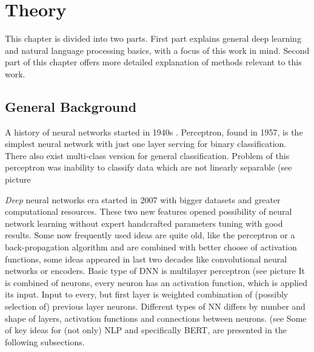 

\chapter{Theory}
\label{chap:theandme}
This chapter is divided into two parts. First part explains general deep learning and natural language processing basics, with a focus of this work in mind. Second part of this chapter offers more detailed explanation of methods relevant to this work.

\section{General Background}
A history of neural networks started in 1940s \citep{Goodfellow-et-al-2016}.
Perceptron, found in 1957, is the simplest neural network with just one layer serving for binary classification. There also exist multi-class version for general classification. Problem of this perceptron was inability to classify data which are not linearly separable (see picture %

\textit{Deep} neural networks era started in 2007 with bigger datasets and greater computational resources. These two new features opened possibility of neural network learning without expert handcrafted parameters tuning with good results.
Some now frequently used ideas are quite old, like the perceptron or a back-propagation algorithm and are combined with better choose of activation functions, some ideas appeared in last two decades like convolutional neural networks or encoders.
Basic type of DNN is multilayer perceptron (see picture %
It is combined of neurons, every neuron has an activation function, which is applied its input. Input to every, but first layer is weighted combination of (possibly selection of) previous layer neurons. 
Different types of NN differs by number and shape of layers, activation functions and connections between neurons. (see %
Some of key ideas for (not only) NLP and specifically BERT, are presented in the following subsections.
